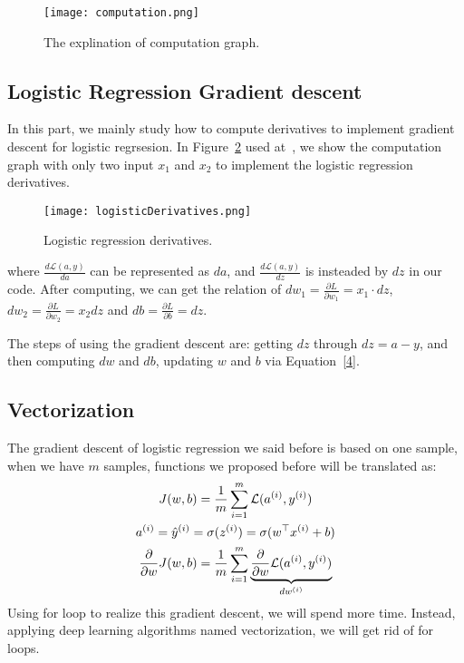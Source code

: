 \documentclass[a4paper]{article}
\begin{document}
\begin{figure}
\begin{center}
\texttt{[image: computation.png]}
\end{center}
\caption{The explination of computation graph.}
\label{fig5}
\end{figure} 

\subsection{Logistic Regression Gradient descent}

In this part, we mainly study how to compute derivatives to implement gradient descent for logistic regrsesion. In Figure~\ref{fig6} used at~\cite{Neural}, we show the computation graph with only two input $x_1$ and $x_2$ to implement the logistic regression derivatives.

\begin{figure}[hb]
\begin{center}
\texttt{[image: logisticDerivatives.png]}
\end{center}
\caption{Logistic regression derivatives.}
\label{fig6}
\end{figure}
where $\frac{d\mathcal{L}(a,y)}{da}$ can be represented as $da$, and $\frac{d\mathcal{L}(a,y)}{dz}$ is insteaded by $dz$ in our code. After computing, we can get the relation of $dw_1 = \frac{\partial L}{\partial w_1} = x_1 \cdot dz$, $dw_2 = \frac{\partial L}{\partial w_2} = x_2 dz$ and $db = \frac{\partial L}{\partial b} = dz$.

The steps of using the gradient descent are: getting $dz$ through $dz = a - y$, and then computing $dw$ and $db$, updating $w$ and $b$ via Equation~\ref{4}.

\subsection{Vectorization}

The gradient descent of logistic regression we said before is based on one sample, when we have $m$ samples, functions we proposed before will be translated as:
\begin{gather}
J(w,b) = \frac{1}{m}\sum_{i=1}^{m}\mathcal{L}(a^{(i)},y^{(i)})\\ \notag
a^{(i)} = \hat{y}^{(i)} = \sigma(z^{(i)}) = \sigma(w^{\top}x^{(i)} + b)\\ \notag
\frac{\partial}{\partial w}J(w,b) = \frac{1}{m}\sum_{i=1}^m\underbrace{\frac{\partial}{\partial w}\mathcal{L}(a^{(i)},y^{(i)})}_{dw^{(i)}}
\end{gather} 
Using for loop to realize this gradient descent, we will spend more time. Instead, applying deep learning algorithms named vectorization, we will get rid of for loops.
\end{document}
